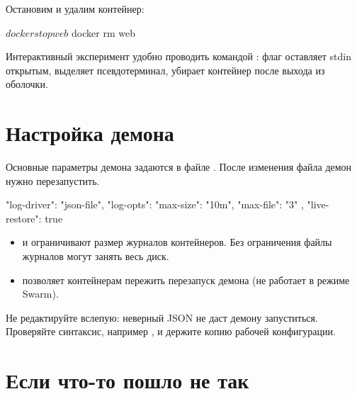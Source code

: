 Остановим и удалим контейнер:

\begin{code}[language=bash]
$ docker stop web
$ docker rm web
\end{code}

\begin{tipbox}
Интерактивный эксперимент удобно проводить командой
: флаг  оставляет stdin
открытым,  выделяет псевдотерминал,  убирает
контейнер после выхода из оболочки.
\end{tipbox}

\section{Настройка демона}

Основные параметры демона задаются в файле .
После изменения файла демон нужно перезапустить.

\begin{code}[language=bash]
{
  "log-driver": "json-file",
  "log-opts": {
    "max-size": "10m",
    "max-file": "3"
  },
  "live-restore": true
}
\end{code}

\begin{itemize}
  \item {} и  ограничивают размер журналов
        контейнеров. Без ограничения файлы журналов могут занять весь диск.
  \item {} позволяет контейнерам пережить перезапуск
        демона (не работает в режиме Swarm).
\end{itemize}

\begin{warnbox}
Не редактируйте  вслепую: неверный JSON не даст демону
запуститься. Проверяйте синтаксис, например
, и держите копию
рабочей конфигурации.
\end{warnbox}

\section{Если что-то пошло не так}

